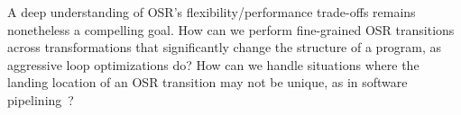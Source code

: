 A deep understanding of OSR's flexibility/performance trade-offs remains nonetheless a compelling goal. How can we perform fine-grained OSR transitions across transformations that significantly change the structure of a program, as aggressive loop optimizations do? How can we handle situations where the landing location of an OSR transition may not be unique, as in software pipelining~\cite{Kundu09}? %

